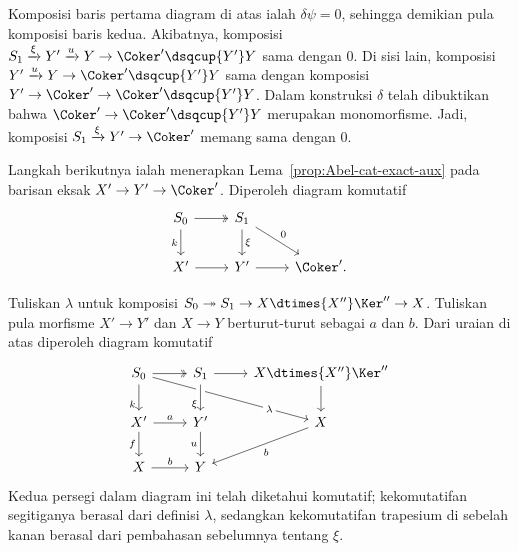 \begin{bukti}
	Komposisi baris pertama diagram di atas ialah $\delta \psi = 0$, sehingga
	demikian pula komposisi baris kedua. Akibatnya, komposisi
	$S_1 \xrightarrow{\xi} Y' \xrightarrow{u} Y \to \Coker' \dsqcup{Y'} Y$
	sama dengan $0$. Di sisi lain, komposisi
	$Y' \xrightarrow{u} Y \to \Coker' \dsqcup{Y'} Y$ sama dengan komposisi
	$Y' \to \Coker' \to \Coker' \dsqcup{Y'} Y$. Dalam konstruksi $\delta$
	telah dibuktikan bahwa $\Coker' \to \Coker' \dsqcup{Y'} Y$ merupakan
	monomorfisme. Jadi, komposisi $S_1 \xrightarrow{\xi} Y' \to \Coker'$
	memang sama dengan $0$.

	Langkah berikutnya ialah menerapkan Lema~\ref{prop:Abel-cat-exact-aux}
	pada barisan eksak $X' \to Y' \to \Coker'$. Diperoleh diagram komutatif
	\[\begin{tikzcd}
		S_0 \arrow[twoheadrightarrow, r] \arrow[d, "k"'] & S_1 \arrow[d, "\xi"] \arrow[rd, "0"] & \\
		X' \arrow[r] & Y' \arrow[r] & \Coker' .
	\end{tikzcd}\]

	Tuliskan $\lambda$ untuk komposisi
	$S_0 \twoheadrightarrow S_1 \to X \dtimes{X''} \Ker'' \to X$.
	Tuliskan pula morfisme $X' \to Y'$ dan $X \to Y$ berturut-turut sebagai
	$a$ dan $b$. Dari uraian di atas diperoleh diagram komutatif
	\[\begin{tikzcd}
		S_0 \arrow[twoheadrightarrow, r] \arrow[d, "k"' near end] \arrow[rrd, "\lambda" description, near end] & S_1 \arrow[d, crossing over, "\xi"' near end] \arrow[r] & X \dtimes{X''} \Ker'' \arrow[d] \\
		X' \arrow[r, "a"] \arrow[d, "f"'] & Y' \arrow[d, "u"'] & X \arrow[ld, "b"] \\
		X \arrow[r, "b"] & Y &
	\end{tikzcd}\]
	Kedua persegi dalam diagram ini telah diketahui komutatif; kekomutatifan
	segitiganya berasal dari definisi $\lambda$, sedangkan kekomutatifan
	trapesium di sebelah kanan berasal dari pembahasan sebelumnya tentang
	$\xi$.
	

\end{bukti}
